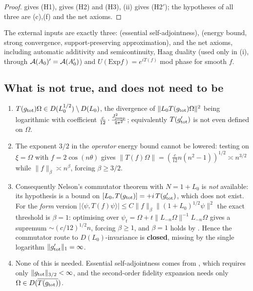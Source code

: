 \begin{proof}
 gives (H1),  gives (H2) and (H3), (ii) gives (H2$'$); the
hypotheses of all three are (c),(f) and the net axioms.
\end{proof}

The external inputs are exactly three: \cite[Thm.~4.4]{CW} (essential self-adjointness),
\cite[Prop.~4.5, Lemma~4.6]{CW} (energy bound, strong convergence, support-preserving approximation), and
the net axioms, including automatic additivity and semicontinuity, Haag duality (used only in
(i), through $\mathcal A(A_{0})'=\mathcal A(A_{0}')$) and $U(\mathrm{Exp}f)=e^{iT(f)}$ mod phase for smooth
$f$.

\subsection{What is not true, and does not need to be}

\begin{proposition}\label{prop:energy}
\begin{enumerate}[label=\textup{(\roman*)},leftmargin=2.4em]
\item $T(g_{\rm tot})\Omega\in D(L_{0}^{1/2})\setminus D(L_{0})$, the divergence of
 $\|L_{0}T(g_{\rm tot})\Omega\|^{2}$ being logarithmic with coefficient
 $\frac{c}{12}\cdot\frac{J_{\rm jump}^{2}}{4\pi^{2}}$; equivalently $T(g_{\rm tot}')$ is not even defined
 on $\Omega$.
\item The exponent $3/2$ in the \emph{operator} energy bound cannot be lowered: testing on $\xi=\Omega$
 with $f=2\cos(n\theta)$ gives $\|T(f)\Omega\|=(\frac{c}{12}n(n^{2}-1))^{1/2}\asymp n^{3/2}$ while
 $\|f\|_{\beta}\asymp n^{\beta}$, forcing $\beta\ge3/2$.
\item Consequently Nelson's commutator theorem with $N=1+L_{0}$ is \emph{not} available: its hypothesis is
 a bound on $[L_{0},T(g_{\rm tot})]=+i\,T(g_{\rm tot}')$, which does not exist.  For the \emph{form}
 version $|\langle\psi,T(f)\psi\rangle|\le C\|f\|_{\beta}\|(1+L_{0})^{1/2}\psi\|^{2}$ the exact threshold is
 $\beta=1$: optimising over $\psi_{t}=\Omega+t\|L_{-n}\Omega\|^{-1}L_{-n}\Omega$ gives a supremum
 $\sim(c/12)^{1/2}n$, forcing $\beta\ge1$, and $\beta=1$ holds by \cite[Lemma~4.1]{CW}.  Hence the
 commutator route to $D(L_{0})$-invariance is \textbf{closed}, missing by the single logarithm
 $\|g_{\rm tot}'\|_{1}=\infty$.
\item None of this is needed.  Essential self-adjointness comes from \cite[Thm.~4.4]{CW}, which requires
 only $\|g_{\rm tot}\|_{3/2}<\infty$, and the second-order fidelity expansion needs only
 $\Omega\in D(\overline{T(g_{\rm tot})})$.
\end{enumerate}
\end{proposition}

